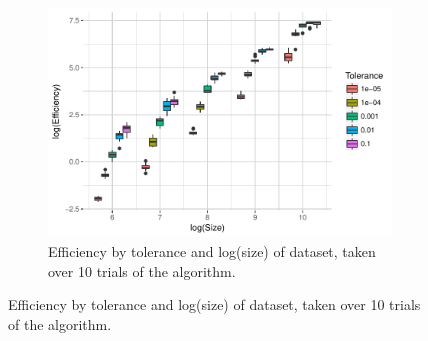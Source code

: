 \documentclass{article}
\begin{document}
\begin{figure}
\begin{subfigure}{0.5\textwidth}
        \includegraphics[width=\linewidth]{Figures/PairwiseDistance/efficiency_by_size_and_tol.pdf}
        \caption{Efficiency by tolerance and log(size) of dataset, taken over 10 trials of the algorithm.}
        \label{fig:PDEfficiencyBySize}
    \end{subfigure}
\end{figure}
\end{document}
